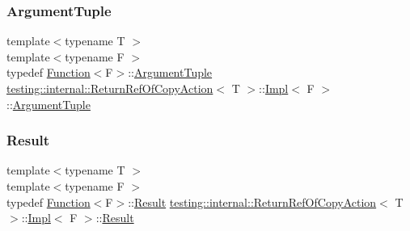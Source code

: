 \mbox{\label{classtesting_1_1internal_1_1_return_ref_of_copy_action_1_1_impl_aae70fc272cfaa8efebffffdeaca36cea}} 
\subsubsection{\texorpdfstring{ArgumentTuple}{ArgumentTuple}\hspace{0.1cm}{\footnotesize\ttfamily [3/3]}}
{\footnotesize\ttfamily template$<$typename T $>$ \\
template$<$typename F $>$ \\
typedef \mbox{\hyperlink{structtesting_1_1internal_1_1_function}{Function}}$<$F$>$\+::\mbox{\hyperlink{classtesting_1_1_action_interface_af72720d864da4d606629e83edc003511}{Argument\+Tuple}} \mbox{\hyperlink{classtesting_1_1internal_1_1_return_ref_of_copy_action}{testing\+::internal\+::\+Return\+Ref\+Of\+Copy\+Action}}$<$ T $>$\+::\mbox{\hyperlink{classtesting_1_1internal_1_1_return_ref_of_copy_action_1_1_impl}{Impl}}$<$ F $>$\+::\mbox{\hyperlink{classtesting_1_1_action_interface_af72720d864da4d606629e83edc003511}{Argument\+Tuple}}}

\mbox{\label{classtesting_1_1internal_1_1_return_ref_of_copy_action_1_1_impl_abb413010cf24f603295ac6426adbe9d0}} 
\subsubsection{\texorpdfstring{Result}{Result}\hspace{0.1cm}{\footnotesize\ttfamily [1/3]}}
{\footnotesize\ttfamily template$<$typename T $>$ \\
template$<$typename F $>$ \\
typedef \mbox{\hyperlink{structtesting_1_1internal_1_1_function}{Function}}$<$F$>$\+::\mbox{\hyperlink{classtesting_1_1_action_interface_a7477de2fe3e4e01c59db698203acaee7}{Result}} \mbox{\hyperlink{classtesting_1_1internal_1_1_return_ref_of_copy_action}{testing\+::internal\+::\+Return\+Ref\+Of\+Copy\+Action}}$<$ T $>$\+::\mbox{\hyperlink{classtesting_1_1internal_1_1_return_ref_of_copy_action_1_1_impl}{Impl}}$<$ F $>$\+::\mbox{\hyperlink{classtesting_1_1_action_interface_a7477de2fe3e4e01c59db698203acaee7}{Result}}}

